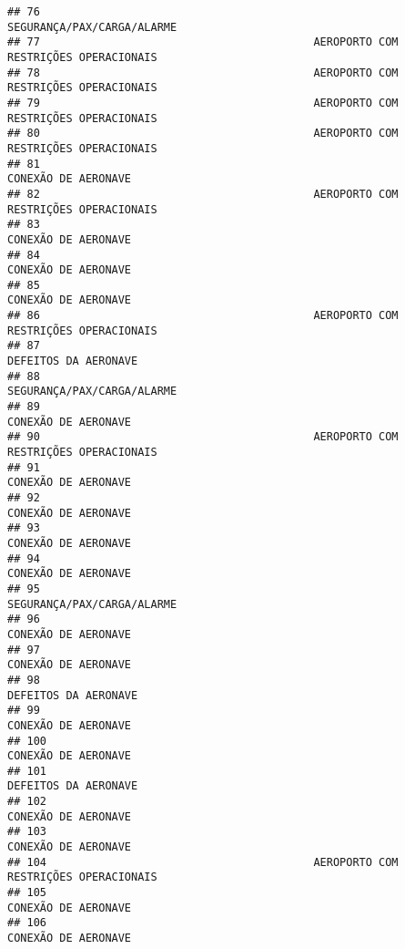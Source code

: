\documentclass[
]{article}
\begin{document}
\begin{verbatim}
## 76                                                     SEGURANÇA/PAX/CARGA/ALARME
## 77                                          AEROPORTO COM RESTRIÇÕES OPERACIONAIS
## 78                                          AEROPORTO COM RESTRIÇÕES OPERACIONAIS
## 79                                          AEROPORTO COM RESTRIÇÕES OPERACIONAIS
## 80                                          AEROPORTO COM RESTRIÇÕES OPERACIONAIS
## 81                                                            CONEXÃO DE AERONAVE
## 82                                          AEROPORTO COM RESTRIÇÕES OPERACIONAIS
## 83                                                            CONEXÃO DE AERONAVE
## 84                                                            CONEXÃO DE AERONAVE
## 85                                                            CONEXÃO DE AERONAVE
## 86                                          AEROPORTO COM RESTRIÇÕES OPERACIONAIS
## 87                                                           DEFEITOS DA AERONAVE
## 88                                                     SEGURANÇA/PAX/CARGA/ALARME
## 89                                                            CONEXÃO DE AERONAVE
## 90                                          AEROPORTO COM RESTRIÇÕES OPERACIONAIS
## 91                                                            CONEXÃO DE AERONAVE
## 92                                                            CONEXÃO DE AERONAVE
## 93                                                            CONEXÃO DE AERONAVE
## 94                                                            CONEXÃO DE AERONAVE
## 95                                                     SEGURANÇA/PAX/CARGA/ALARME
## 96                                                            CONEXÃO DE AERONAVE
## 97                                                            CONEXÃO DE AERONAVE
## 98                                                           DEFEITOS DA AERONAVE
## 99                                                            CONEXÃO DE AERONAVE
## 100                                                           CONEXÃO DE AERONAVE
## 101                                                          DEFEITOS DA AERONAVE
## 102                                                           CONEXÃO DE AERONAVE
## 103                                                           CONEXÃO DE AERONAVE
## 104                                         AEROPORTO COM RESTRIÇÕES OPERACIONAIS
## 105                                                           CONEXÃO DE AERONAVE
## 106                                                           CONEXÃO DE AERONAVE

\end{verbatim}
\end{document}
